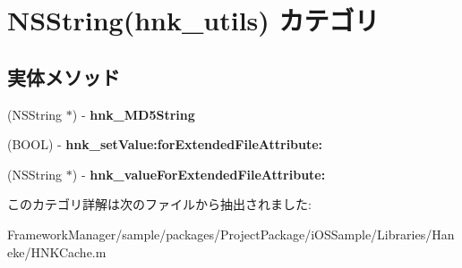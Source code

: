 \hypertarget{category_n_s_string_07hnk__utils_08}{}\section{N\+S\+String(hnk\+\_\+utils) カテゴリ}
\label{category_n_s_string_07hnk__utils_08}
\subsection*{実体メソッド}
\begin{DoxyCompactItemize}
\item 
\hypertarget{category_n_s_string_07hnk__utils_08_a6a6195ba8f513bda63c11cc570512b43}{}(N\+S\+String $\ast$) -\/ {\bfseries hnk\+\_\+\+M\+D5\+String}\label{category_n_s_string_07hnk__utils_08_a6a6195ba8f513bda63c11cc570512b43}

\item 
\hypertarget{category_n_s_string_07hnk__utils_08_af613ce537098fd8e06e43eb494e3d345}{}(B\+O\+O\+L) -\/ {\bfseries hnk\+\_\+set\+Value\+:for\+Extended\+File\+Attribute\+:}\label{category_n_s_string_07hnk__utils_08_af613ce537098fd8e06e43eb494e3d345}

\item 
\hypertarget{category_n_s_string_07hnk__utils_08_a45cd4bf28386e923494c2bee1b9d8956}{}(N\+S\+String $\ast$) -\/ {\bfseries hnk\+\_\+value\+For\+Extended\+File\+Attribute\+:}\label{category_n_s_string_07hnk__utils_08_a45cd4bf28386e923494c2bee1b9d8956}

\end{DoxyCompactItemize}


このカテゴリ詳解は次のファイルから抽出されました\+:\begin{DoxyCompactItemize}
\item 
Framework\+Manager/sample/packages/\+Project\+Package/i\+O\+S\+Sample/\+Libraries/\+Haneke/H\+N\+K\+Cache.\+m\end{DoxyCompactItemize}
